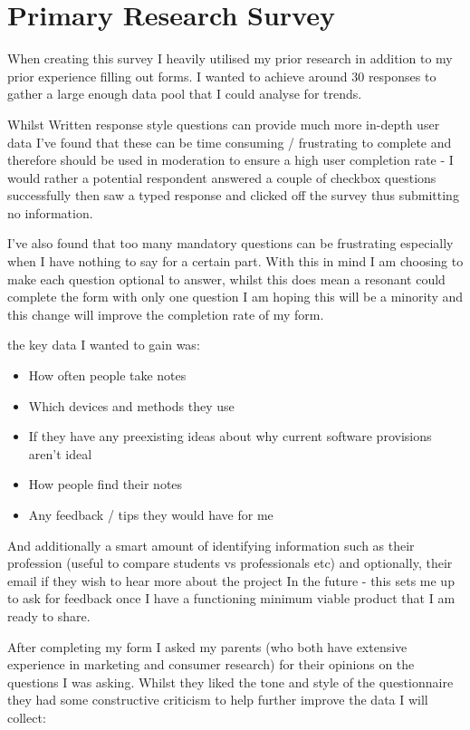 \section{Primary Research Survey}
\label{research:PrimaryResearchSurvey}
When creating this survey I heavily utilised my prior research in addition to my prior experience filling out forms. I wanted to achieve around 30 responses to gather a large enough data pool that I could analyse for trends. 

Whilst Written response style questions can provide much more in-depth user data I've found that these can be time consuming / frustrating to complete and therefore should be used in moderation to ensure a high user completion rate - I would rather a potential respondent answered a couple of checkbox questions successfully then saw a typed response and clicked off the survey thus submitting no information.

I've also found that too many mandatory questions can be frustrating especially when I have nothing to say for a certain part. With this in mind I am choosing to make each question optional to answer, whilst this does mean a resonant could complete the form with only one question I am hoping this will be a minority and this change will improve the completion rate of my form.

 the key data I wanted to gain was:
 \begin{itemize}
    \item How often people take notes 
    \item Which devices and methods they use
    \item  If they have any preexisting ideas about why current software provisions aren't ideal
    \item How people find their notes
    \item Any feedback / tips they would have for me
 \end{itemize}
	
And additionally a smart amount of identifying information such as their profession (useful to compare students vs professionals etc) and optionally, their email if they wish to hear more about the project In the future - this sets me up to ask for feedback once I have a functioning minimum viable product that I am ready to share.

After completing my form I asked my parents (who both have extensive experience in marketing and consumer research) for their opinions on the questions I was asking. Whilst they liked the tone and style of the questionnaire they had some constructive criticism to help further improve the data I will collect:

